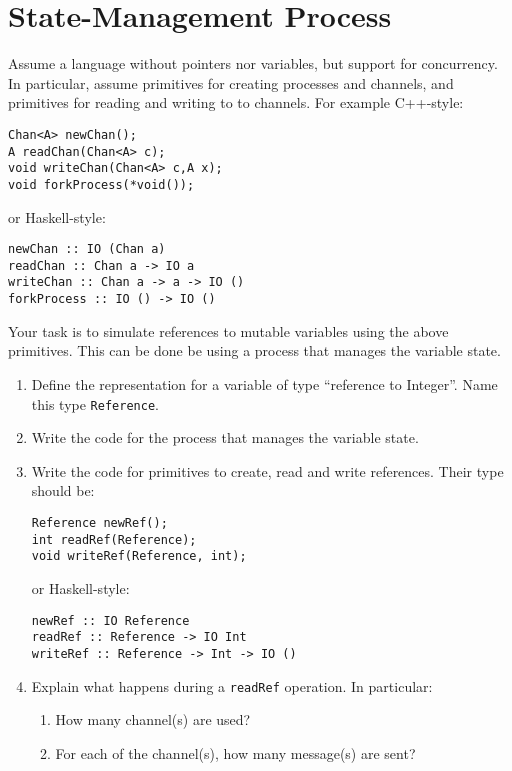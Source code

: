 \documentclass{article}
\newcommand{\answer}[1]{}
\begin{document}
\answer{
\begin{enumerate}
\item 10
\item 9
\item
Replacement:
\begin{verbatim}
  stk->n = stk -> n-1;
  int tmp = stk->s;
  stk->s = stk -> i;
  stk->i = tmp;
\end{verbatim}
\item 11, 12, 15

\end{enumerate}

}
\newpage
\section{State-Management Process}
Assume a language without pointers nor variables, but support for
concurrency. In particular, assume primitives for creating processes
and channels, and primitives for reading and writing to to
channels. For example C++-style:

\begin{verbatim}
Chan<A> newChan();
A readChan(Chan<A> c);
void writeChan(Chan<A> c,A x);
void forkProcess(*void());
\end{verbatim}
or Haskell-style:
\begin{verbatim}
newChan :: IO (Chan a)
readChan :: Chan a -> IO a
writeChan :: Chan a -> a -> IO ()
forkProcess :: IO () -> IO ()
\end{verbatim}

Your task is to simulate references to mutable variables using the
above primitives. This can be done be using a process that manages the
variable state.

\begin{enumerate}
\item Define the representation for a variable of type ``reference to
  Integer''. Name this type \texttt{Reference}. 
\item Write the code for the process that manages the variable state. 
\item Write the code for primitives to create, read and write references. 
Their type should be:
\begin{verbatim}
Reference newRef();
int readRef(Reference);
void writeRef(Reference, int);
\end{verbatim}
or Haskell-style:
\begin{verbatim}
newRef :: IO Reference
readRef :: Reference -> IO Int
writeRef :: Reference -> Int -> IO ()
\end{verbatim}
\item Explain what happens during a \texttt{readRef} operation. In particular:
  \begin{enumerate}
  \item How many channel(s) are used? 
  \item For each of the channel(s), how many message(s) are sent?  
  \end{enumerate}
\end{enumerate}
\end{document}
